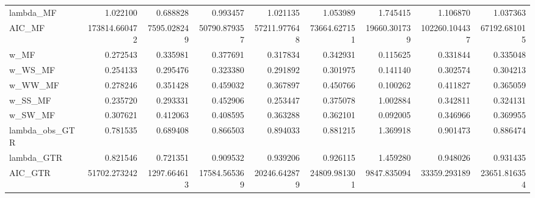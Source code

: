 \begin{tabular}{lrrrrrrrr}
lambda\_MF         &       1.022100 &     0.688828 &      0.993457 &         1.021135 &      1.053989 &      1.745415 &       1.106870 &      1.037363 \\
AIC\_MF            &  173814.660472 &  7595.028249 &  50790.879357 &     57211.977648 &  73664.627151 &  19660.301739 &  102260.104437 &  67192.681015 \\
w\_MF              &       0.272543 &     0.335981 &      0.377691 &         0.317834 &      0.342931 &      0.115625 &       0.331844 &      0.335048 \\
w\_WS\_MF           &       0.254133 &     0.295476 &      0.323380 &         0.291892 &      0.301975 &      0.141140 &       0.302574 &      0.304213 \\
w\_WW\_MF           &       0.278246 &     0.351428 &      0.459032 &         0.367897 &      0.450766 &      0.100262 &       0.411827 &      0.365059 \\
w\_SS\_MF           &       0.235720 &     0.293331 &      0.452906 &         0.253447 &      0.375078 &      1.002884 &       0.342811 &      0.324131 \\
w\_SW\_MF           &       0.307621 &     0.412063 &      0.408595 &         0.363288 &      0.362101 &      0.092005 &       0.346966 &      0.369955 \\
lambda\_obs\_GTR    &       0.781535 &     0.689408 &      0.866503 &         0.894033 &      0.881215 &      1.369918 &       0.901473 &      0.886474 \\
lambda\_GTR        &       0.821546 &     0.721351 &      0.909532 &         0.939206 &      0.926115 &      1.459280 &       0.948026 &      0.931435 \\
AIC\_GTR           &   51702.273242 &  1297.664613 &  17584.565369 &     20246.642879 &  24809.981301 &   9847.835094 &   33359.293189 &  23651.816354 \\
\bottomrule
\end{tabular}
